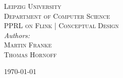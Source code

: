 \begin{titlepage}

	\begin{flushright}
	
		\textsc{\small Leipzig University}\\[0.1cm]
		\textsc{\small Department of Computer Science}\\[2cm]
		
		\textsc{\LARGE PPRL on Flink | Conceptual Design}\\[2cm]
		
		
        \emph{Authors:}\\[0.2cm]
		\textsc{Martin Franke}\\[0.2cm]
		\textsc{Thomas Hornoff}\\[0.2cm]
		
		\vfill
		
		{\today}
	
	\end{flushright}
	
\end{titlepage}
